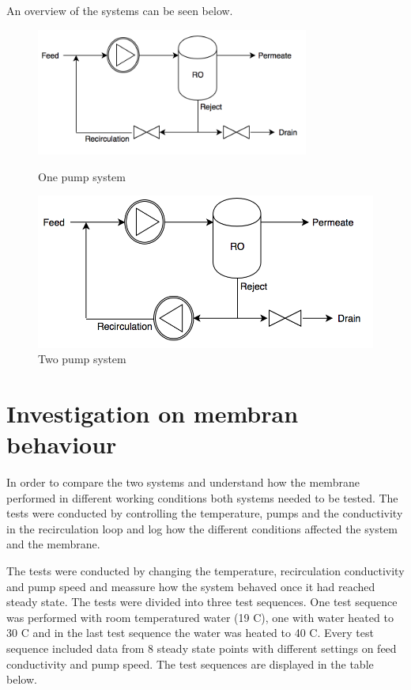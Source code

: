 An overview of the systems can be seen below.\\
\begin{figure}[h]
\centering
\begin{minipage}{.5\textwidth}
    \centering
    \includegraphics[width=0.8\textwidth]{Sys1}
    \caption{One pump system}
    \label{fig:System1}
\end{minipage}%
\begin{minipage}{.5\textwidth}
  \centering
  \includegraphics[width=.8\linewidth]{Sys2}
  \caption{Two pump system}
  \label{fig:System2}
\end{minipage}
\end{figure}

\newpage

\section{Investigation on membran behaviour}

In order to compare the two systems and understand how the membrane performed in different working conditions both systems needed to be tested. The tests were conducted by controlling the temperature, pumps and the conductivity in the recirculation loop and log how the different conditions affected the system and the membrane. 

The tests were conducted by changing the temperature, recirculation conductivity and pump speed and meassure how the system behaved once it had reached steady state. The tests were divided into three test sequences. One test sequence was performed with room temperatured water (19 C), one with water heated to 30 C and in the last test sequence the water was heated to 40 C. Every test sequence included data from 8 steady state points with different settings on feed conductivity and pump speed. The test sequences are displayed in the table below. 

